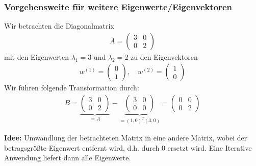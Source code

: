 \subsubsection{Vorgehensweite für weitere Eigenwerte/Eigenvektoren}
Wir betrachten die Diagonalmatrix
%
\begin{align*}
  A = \begin{pmatrix}
    3 & 0 \\ 0 & 2
  \end{pmatrix}
\end{align*}
%
mit den Eigenwerten $\lambda_1=3$ und $\lambda_2=2$ zu den Eigenvektoren
%
\begin{align*}
  w^{(1)}=\begin{pmatrix}
    0 \\ 1
  \end{pmatrix}, \quad w^{(2)}= \begin{pmatrix}
    1 \\ 0
  \end{pmatrix}
\end{align*}
%
Wir führen folgende Transformation durch:
%
\begin{align*}
  B = \underbrace{\begin{pmatrix}
    3 & 0 \\ 0 & 2
  \end{pmatrix}}_{=A} - \underbrace{\begin{pmatrix}
    3 & 0 \\ 0 & 0
  \end{pmatrix}}_{=(1,0)^T(3,0)} 
  = \begin{pmatrix}
    0 & 0 \\ 0 & 2
  \end{pmatrix}
\end{align*}

\textbf{Idee:} 
Umwandlung der betrachteten Matrix in eine andere Matrix, wobei der betragsgrößte Eigenwert entfernt
wird, d.h. durch $0$ ersetzt wird. Eine Iterative Anwendung liefert dann alle Eigenwerte. 

